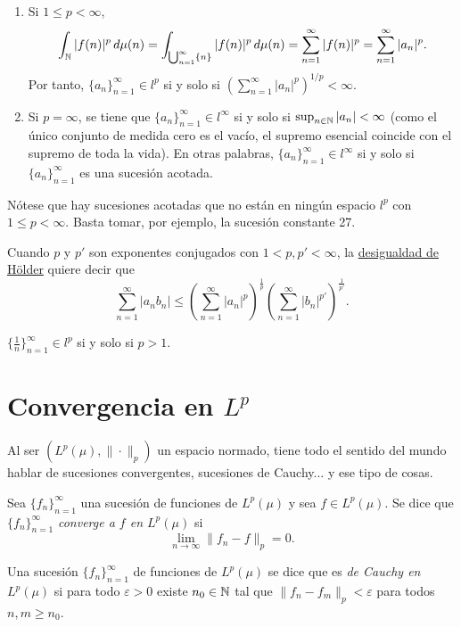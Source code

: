 \documentclass[a4paper, 11pt, oneside]{report}
\begin{document}
\begin{enumerate}
  \item Si $1 \leq p < \infty$,
  \[\int_\mathbb N |f(n)|^p \, d\mu(n) = \int_{\bigcup_{n = 1}^\infty \{n\}} |f(n)|^p \, d\mu(n) = \sum_{n=1}^\infty |f(n)|^p = \sum_{n=1}^\infty |a_n|^p.\]
  Por tanto, $\{a_n\}_{n=1}^\infty \in l^p$ si y solo si $(\sum_{n=1}^\infty |a_n|^p)^{1/p} <\infty$.
  \item Si $p = \infty$, se tiene que $\{a_n\}_{n=1}^\infty \in l^\infty$ si y solo si $\sup_{n\in \mathbb N} |a_n| < \infty$ (como el único conjunto de medida cero es el vacío, el supremo esencial coincide con el supremo de toda la vida). En otras palabras, $\{a_n\}_{n=1}^\infty \in l^\infty$ si y solo si $\{a_n\}_{n=1}^\infty$ es una sucesión acotada.
\end{enumerate}

Nótese que hay sucesiones acotadas que no están en ningún espacio $l^p$ con $1 \leq p < \infty$. Basta tomar, por ejemplo, la sucesión constante 27.

Cuando $p$ y $p'$ son exponentes conjugados con $1 < p,p' < \infty$, la \hyperref[cor:1.4.4]{\color{c1}desigualdad de Hölder} quiere decir que
\[\sum_{n=1}^\infty |a_nb_n| \leq \left(\sum_{n=1}^\infty |a_n|^p\right)^{\frac{1}{p}}\left(\sum_{n=1}^\infty |b_n|^{p'}\right)^{\frac{1}{p'}}.\]

\begin{example}
  $\{\frac{1}{n}\}_{n=1}^\infty \in l^p$ si y solo si $p > 1$.
\end{example}

\section[Convergencia en \texorpdfstring{$L^p$}{Lp}]{Convergencia en \texorpdfstring{\boldmath$L^p$}{Lp}}

Al ser $(L^p(\mu), \|\cdot\|_p)$ un espacio normado, tiene todo el sentido del mundo hablar de sucesiones convergentes, sucesiones de Cauchy... y ese tipo de cosas.

\begin{definition}
  Sea $\{f_n\}_{n=1}^\infty$ una sucesión de funciones de $L^p(\mu)$ y sea $f \in L^p(\mu)$. Se dice que $\{f_n\}_{n=1}^\infty$ \emph{converge a $f$ en $L^p(\mu)$} si 
  \[\lim_{n \to \infty} \|f_n-f\|_p = 0.\]
\end{definition}

\begin{definition}
  Una sucesión $\{f_n\}_{n=1}^\infty$ de funciones de $L^p(\mu)$ se dice que es \emph{de Cauchy en $L^p(\mu)$} si para todo $\varepsilon>0$ existe $n_0 \in \mathbb N$ tal que $\|f_n-f_m\|_p < \varepsilon$ para todos $n,m \geq n_0$. 
\end{definition}
\end{document}
